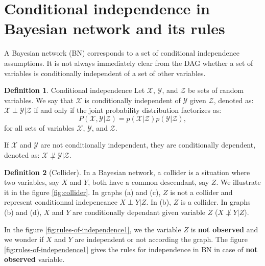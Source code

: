 \documentclass[12pt, a4paper]{article}
\theoremstyle{definition}
\newtheorem{definition}{Definition}[section]
\numberwithin{figure}{section}
\numberwithin{equation}{section}
\numberwithin{table}{section}
\begin{document}
\section{Conditional independence in Bayesian network and its rules}
A Bayesian network (BN) corresponds to a set of conditional independence assumptions. It is not always immediately clear from the DAG whether a set of variables is conditionally independent of a set of other variables.

\begin{definition}{Conditional independence}
Let $\mathcal{X}$, $\mathcal{Y}$, and $\mathcal{Z}$ be sets of random variables. We say that $\mathcal{X}$ is conditionally independent of $\mathcal{Y}$ given $\mathcal{Z}$, denoted as: $\mathcal{X} \perp \mathcal{Y} | \mathcal{Z}$ if and only if the joint probability distribution factorizes as:
\begin{equation}
P(\mathcal{X}, \mathcal{Y} | \mathcal{Z}) = p(\mathcal{X} | \mathcal{Z}) p(\mathcal{Y} | \mathcal{Z}),
\end{equation}
for all sets of variables $\mathcal{X}$, $\mathcal{Y}$, and $\mathcal{Z}$.

If $\mathcal{X}$ and $\mathcal{Y}$ are not conditionally independent, they are conditionally dependent, denoted as: $\mathcal{X} \not\perp \mathcal{Y} | \mathcal{Z}$.
\end{definition}

\begin{definition}[Collider]

In a Bayesian network, a collider is a situation where two variables, say $X$ and $Y$, both have a common descendant, say $Z$. We illustrate it in the figure \ref{fig:collider}. In graphs (a) and (c), $Z$ is not a collider and represent conditionnal indepencance $X \perp Y|Z$. In (b), $Z$ is a collider. In graphs (b) and (d), $X$ and $Y$ are conditionally dependant given variable $Z$ ($X \not\perp Y|Z$).
\end{definition}


In the figure \ref{fig:rules-of-independence1}, we the variable $Z$ is \textbf{not observed} and we wonder if $X$ and $Y$ are independent or not according the graph. The figure \ref{fig:rules-of-independence1} gives the rules for independence in BN in case of \textbf{not observed} variable.

\end{document}
